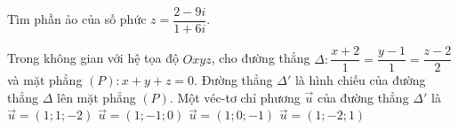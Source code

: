 \begin{ex}%
	Tìm phần ảo của số phức $z=\dfrac{2-9i}{1+6i}$. 
\end{ex}
\begin{ex}%
	Trong không gian với hệ tọa độ $Oxyz$, cho đường thẳng $\Delta: \dfrac{x + 2}{1}=\dfrac{y - 1}{1}=\dfrac{z - 2}{2}$ và mặt phẳng $(P): x + y + z=0. $ Đường thẳng ${\Delta}'$ là hình chiếu của đường thẳng $\Delta $ lên mặt phẳng $(P). $ Một véc-tơ chỉ phương $\overrightarrow{u}$ của đường thẳng ${\Delta}'$ là
	\choice
	{\True $\overrightarrow{u}=\left(1; 1; - 2\right)$}
	{$\overrightarrow{u}=\left(1; - 1; 0\right)$}
	{$\overrightarrow{u}=\left(1; 0; - 1\right)$}
	{$\overrightarrow{u}=\left(1; - 2; 1\right)$}
\end{ex}

